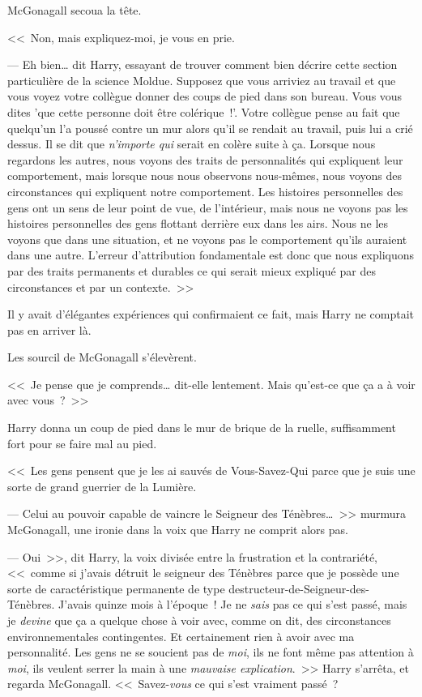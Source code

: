 McGonagall secoua la tête.

<<~Non, mais expliquez-moi, je vous en prie.

--- Eh bien… dit Harry, essayant de trouver comment bien décrire cette section particulière de la science Moldue. Supposez que vous arriviez au travail et que vous voyez votre collègue donner des coups de pied dans son bureau. Vous vous dites 'que cette personne doit être colérique~!'. Votre collègue pense au fait que quelqu'un l'a poussé contre un mur alors qu'il se rendait au travail, puis lui a crié dessus. Il se dit que \emph{n'importe qui} serait en colère suite à ça. Lorsque nous regardons les autres, nous voyons des traits de personnalités qui expliquent leur comportement, mais lorsque nous nous observons nous-mêmes, nous voyons des circonstances qui expliquent notre comportement. Les histoires personnelles des gens ont un sens de leur point de vue, de l'intérieur, mais nous ne voyons pas les histoires personnelles des gens flottant derrière eux dans les airs. Nous ne les voyons que dans une situation, et ne voyons pas le comportement qu'ils auraient dans une autre. L'erreur d'attribution fondamentale est donc que nous expliquons par des traits permanents et durables ce qui serait mieux expliqué par des circonstances et par un contexte.~>>

Il y avait d'élégantes expériences qui confirmaient ce fait, mais Harry ne comptait pas en arriver là.

Les sourcil de McGonagall s'élevèrent.

<<~Je pense que je comprends… dit-elle lentement. Mais qu'est-ce que ça a à voir avec vous~?~>>

Harry donna un coup de pied dans le mur de brique de la ruelle, suffisamment fort pour se faire mal au pied. 

<<~Les gens pensent que je les ai sauvés de Vous-Savez-Qui parce que je suis une sorte de grand guerrier de la Lumière.

--- Celui au pouvoir capable de vaincre le Seigneur des Ténèbres…~>> murmura McGonagall, une ironie dans la voix que Harry ne comprit alors pas.

--- Oui~>>, dit Harry, la voix divisée entre la frustration et la contrariété, <<~comme si j'avais détruit le seigneur des Ténèbres parce que je possède une sorte de caractéristique permanente de type destructeur-de-Seigneur-des-Ténèbres. J'avais quinze mois à l'époque~! Je ne \emph{sais} pas ce qui s'est passé, mais je \emph{devine} que ça a quelque chose à voir avec, comme on dit, des circonstances environnementales contingentes. Et certainement rien à avoir avec ma personnalité. Les gens ne se soucient pas de \emph{moi}, ils ne font même pas attention à \emph{moi}, ils veulent serrer la main à une \emph{mauvaise explication}.~>> Harry s'arrêta, et regarda McGonagall. <<~Savez-\emph{vous} ce qui s'est vraiment passé~?

